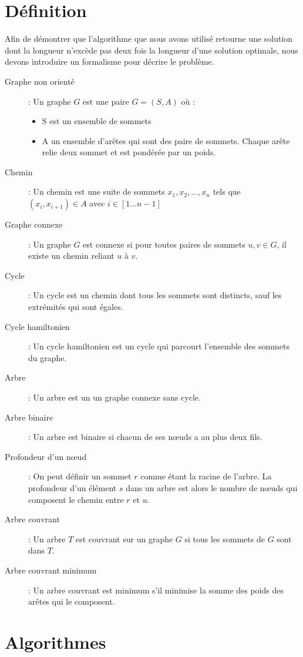 \documentclass[a4paper,11pt]{article}
\begin{document}
\section{Définition} %
Afin de démontrer que l'algorithme que nous avons utilisé retourne une solution dont la longueur n'excède pas deux fois la longueur d'une solution optimale, nous devons introduire un formalisme pour décrire le problème.
\begin{description}
 \item[Graphe non orienté] : Un graphe $G$ est une paire $G = (S, A)$ où :
 \begin{itemize}
 \renewcommand{\FrenchLabelItem}{\textbullet}
  \item S est un ensemble de sommets
  \item A un ensemble d'arêtes qui sont des paire de sommets. Chaque arête relie deux sommet et est pondérée par un poids.
 \end{itemize}
 \item[Chemin] : Un chemin est une suite de sommets $x_1, x_2, \ldots, x_n$ tels que $\left(x_i, x_{i+1}\right) \in A$ avec $i \in \left[1\ldots n-1\right]$
 \item[Graphe connexe] : Un graphe $G$ est connexe si pour toutes paires de sommets $u, v \in G$, il existe un chemin reliant $u$ à $v$.
 \item[Cycle] : Un cycle est un chemin dont tous les sommets sont distincts, sauf les extrémités qui sont égales.
 \item[Cycle hamiltonien] : Un cycle hamiltonien est un cycle qui parcourt l'ensemble des sommets du graphe.
 \item[Arbre] : Un arbre est un un graphe connexe sans cycle.
 \item[Arbre binaire] : Un arbre est binaire si chacun de ses nœuds a au plus deux fils.
 \item[Profondeur d'un nœud] : On peut définir un sommet $r$ comme étant la racine de l'arbre. La profondeur d'un élément $s$ dans un arbre est alors le nombre de nœuds qui composent le chemin entre $r$ et $u$.
 \item[Arbre couvrant] : Un arbre $T$ est couvrant sur un graphe $G$ si tous les sommets de $G$ sont dans $T$.
 \item[Arbre couvrant minimum] : Un arbre couvrant est minimum s'il minimise la somme des poids des arêtes qui le composent.
\end{description}

\section{Algorithmes}
\end{document}
